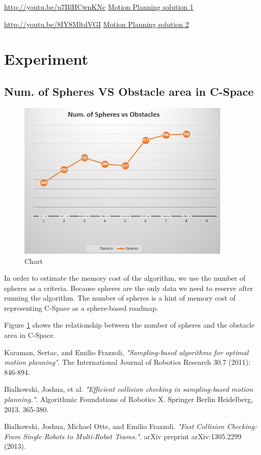 \documentclass{article}
\begin{document}
    \url{http://youtu.be/u7BlHCwnKNc}
    \href{http://youtu.be/u7BlHCwnKNc}{ Motion Planning solution 1 }

    \url{http://youtu.be/8IY8MltdVGI}
    \href{http://youtu.be/8IY8MltdVGI}{ Motion Planning solution 2 }

\section{Experiment}
  \subsection{ Num. of Spheres VS Obstacle area in C-Space }
    \begin{figure}[h]
      \centering
      \includegraphics[width=4in]{Chart.PNG}
      \caption{Chart}
      \label{fig:chart1}
    \end{figure}
    
    In order to estimate the memory cost of the algorithm, we use the number of spheres as a criteria. Because spheres are the only data we need to reserve after running the algorithm. The number of spheres is a hint of memory cost of representing C-Space as a sphere-based roadmap. 

    Figure \ref{fig:chart1} shows the relationship between the number of spheres and the obstacle area in C-Space.

\begin{thebibliography}{9}

  Karaman, Sertac, and Emilio Frazzoli,
  \emph{"Sampling-based algorithms for optimal motion planning"}.
  The International Journal of Robotics Research 30.7 (2011): 846-894.

  Bialkowski, Joshua, et al.
  \emph{"Efficient collision checking in sampling-based motion planning."}. Algorithmic Foundations of Robotics X. Springer Berlin Heidelberg, 2013. 365-380.

  Bialkowski, Joshua, Michael Otte, and Emilio Frazzoli. 
  \emph{"Fast Collision Checking: From Single Robots to Multi-Robot Teams."}. 
  arXiv preprint arXiv:1305.2299 (2013).

\end{thebibliography}
\end{document}
